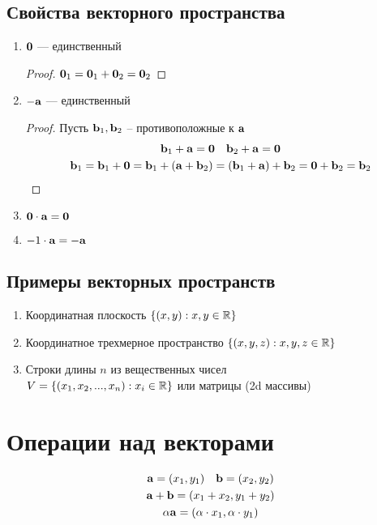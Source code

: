 \documentclass[main]{subfiles}
\begin{document}
\subsection{Свойства векторного пространства}

\begin{enumerate}
    \item $\mathbf{0}$ --- единственный \begin{proof}
              $\mathbf{0}_1 = \mathbf{0}_1 + \mathbf{0}_2 = \mathbf{0}_2$
          \end{proof}
    \item $-\mathbf{a}$ --- единственный \begin{proof}
              Пусть $\mathbf{b}_1, \mathbf{b}_2$ -- противоположные к $\mathbf{a}$
              \begin{gather*}
                  \mathbf{b}_1 + \mathbf{a} = \mathbf{0} \quad \mathbf{b}_2 + \mathbf{a} = \mathbf{0}\\
                  \mathbf{b}_1 = \mathbf{b}_1 + \mathbf{0} = \mathbf{b}_1 + (\mathbf{a} + \mathbf{b}_2) = (\mathbf{b}_1+\mathbf{a})+\mathbf{b}_2 = \mathbf{0} +\mathbf{b}_2 = \mathbf{b}_2
              \end{gather*}
          \end{proof}
    \item $\mathbf{0}\cdot \mathbf{a} = \mathbf{0}$
    \item $-1\cdot \mathbf{a} = -\mathbf{a}$
\end{enumerate}

\subsection{Примеры векторных пространств}
\begin{enumerate}
    \item Координатная плоскость $\{(x,y): x,y\in \mathbb{R}\}$
    \item Координатное трехмерное пространство $\{(x,y,z): x,y,z\in \mathbb{R}\}$
    \item Строки длины $n$ из вещественных чисел \\
          $V = \{(x_1, x_2, ..., x_n): x_i \in \mathbb{R}\}$ или матрицы (2d массивы)
\end{enumerate}

\section{Операции над векторами}
\begin{gather*}
    \mathbf{a} = (x_1, y_1) \quad \mathbf{b} = (x_2, y_2)\\
    \mathbf{a} + \mathbf{b} = (x_1+x_2, y_1+y_2)\\
    \alpha \mathbf{a} = (\alpha\cdot x_1, \alpha\cdot y_1)
\end{gather*}
\end{document}
